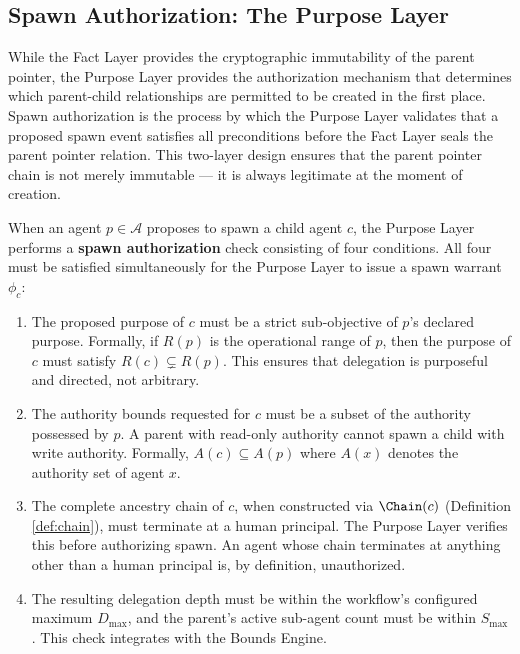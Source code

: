 \subsection{Spawn Authorization: The Purpose Layer}
\label{sec:purpose_layer_authorization}

While the Fact Layer provides the cryptographic immutability of the parent pointer, the Purpose Layer provides the authorization mechanism that determines which parent-child relationships are permitted to be created in the first place. Spawn authorization is the process by which the Purpose Layer validates that a proposed spawn event satisfies all preconditions before the Fact Layer seals the parent pointer relation. This two-layer design ensures that the parent pointer chain is not merely immutable — it is always legitimate at the moment of creation.

\begin{definition}
\label{def:spawn_authorization}
When an agent $p \in \mathcal{A}$ proposes to spawn a child agent $c$, the Purpose Layer performs a \textbf{spawn authorization} check consisting of four conditions. All four must be satisfied simultaneously for the Purpose Layer to issue a spawn warrant $\phi_c$:

\begin{enumerate}
    \item[(S1) \textbf{Purpose Consistency}] The proposed purpose of $c$ must be a strict sub-objective of $p$'s declared purpose. Formally, if $R(p)$ is the operational range of $p$, then the purpose of $c$ must satisfy $R(c) \subsetneq R(p)$. This ensures that delegation is purposeful and directed, not arbitrary.

    \item[(S2) \textbf{Authority Monotonicity}] The authority bounds requested for $c$ must be a subset of the authority possessed by $p$. A parent with read-only authority cannot spawn a child with write authority. Formally, $A(c) \subseteq A(p)$ where $A(x)$ denotes the authority set of agent $x$.

    \item[(S3) \textbf{Human Ground}] The complete ancestry chain of $c$, when constructed via $\Chain(c)$ (Definition \ref{def:chain}), must terminate at a human principal. The Purpose Layer verifies this before authorizing spawn. An agent whose chain terminates at anything other than a human principal is, by definition, unauthorized.

    \item[(S4) \textbf{Bounds Compliance}] The resulting delegation depth must be within the workflow's configured maximum $D_{\max}$, and the parent's active sub-agent count must be within $S_{\max}$. This check integrates with the Bounds Engine.
\end{enumerate}
\end{definition}

